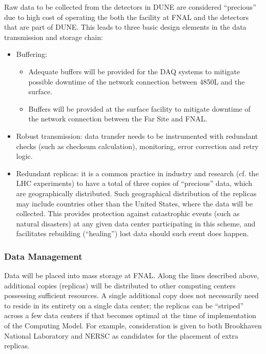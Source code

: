 Raw data to be collected from the detectors in DUNE are considered
``precious'' due to high cost of operating the both the facility at
FNAL and the detectors that are part of DUNE. This leads to three
basic design elements in the data transmission and storage chain:
\begin{itemize}
\item Buffering:
\begin{itemize}
\item Adequate buffers will be provided for the DAQ systems to
  mitigate possible downtime of the network connection between 4850L
  and the surface.
\item Buffers will be provided at the surface facility to mitigate
  downtime of the network connection between the Far Site and FNAL.
\end{itemize}
\item Robust transmission: data transfer needs to be instrumented with
  redundant checks (such as checksum calculation), monitoring, error
  correction and retry logic.
\item Redundant replicas: it is a common practice in industry and
  research (cf. the LHC experiments) to have a total of three copies
  of ``precious'' data, which are geographically distributed.  Such
  geographical distribution of the replicas may include countries
  other than the United States, where the data will be collected.
  This provides protection against catastrophic events (such as
  natural disasters) at any given data center participating in this
  scheme, and facilitates rebuilding (``healing'') lost data should
  such event does happen.
\end{itemize}


\subsubsection{Data Management}
\label{sec:detectors-sc-infrastructure-computing-model-data-mgt}

Data will be placed into mass storage at FNAL. Along the lines
described above, additional copies (replicas) will be distributed to
other computing centers possessing sufficient resources.  A single
additional copy does not necessarily need to reside in its entirety on
a single data center; the replicas can be ``striped'' across a few
data centers if that becomes optimal at the time of implementation of
the Computing Model. For example, consideration is given to both
Brookhaven National Laboratory and NERSC as candidates for the
placement of extra replicas.

